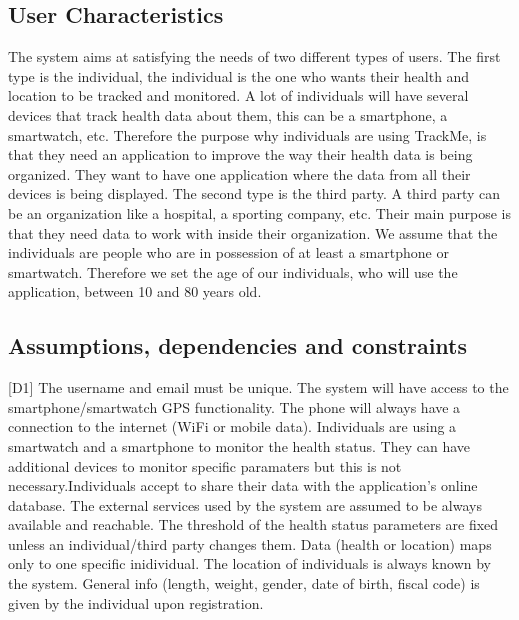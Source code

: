 \documentclass[12pt]{article}
\begin{document}
\subsection{User Characteristics}
The system aims at satisfying the needs of two different types of users. The first type is the individual, the individual is the one who wants their health and location to be tracked and monitored. A lot of individuals will have several devices that track health data about them, this can be a smartphone, a smartwatch, etc. Therefore the purpose why individuals are using TrackMe, is that they need an application to improve the way their health data is being organized. They want to have one application where the data from all their devices is being displayed. The second type is the third party. A third party can be an organization like a hospital, a sporting company, etc. Their main purpose is that they need data to work with inside their organization. We assume that the individuals are people who are in possession of at least a smartphone or smartwatch. Therefore we set the age of our individuals, who will use the application, between 10 and 80 years old.

\subsection{Assumptions, dependencies and constraints}
[D1] The username and email must be unique. \newline
[D2] The system will have access to the smartphone/smartwatch GPS functionality. \newline
[D3] The phone will always have a connection to the internet (WiFi or mobile data). \newline
[D4] Individuals are using a smartwatch and a smartphone to monitor the health status. They can have additional devices to monitor specific paramaters but this is not necessary.\newline
[D5] Individuals accept to share their data with the application's online database. \newline
[D6] The external services used by the system are assumed to be always available and reachable. \newline
[D7] The threshold of the health status parameters are fixed unless an individual/third party changes them. \newline
[D8] Data (health or location) maps only to one specific inidividual. \newline
[D9] The location of individuals is always known by the system. \newline
[D10] General info (length, weight, gender, date of birth, fiscal code) is given by the individual upon registration. \newline
\end{document}
